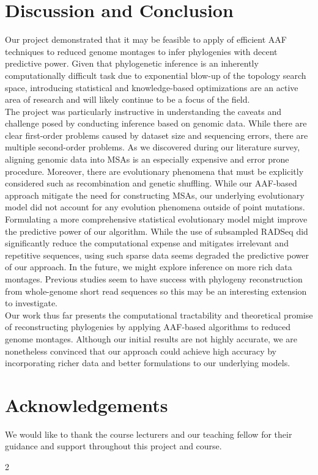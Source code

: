 \documentclass[a4paper]{article}
\begin{document}
\begin{multicols}{2}
\section{Discussion and Conclusion}
Our project demonstrated that it may be feasible to apply of efficient AAF techniques to reduced genome montages to infer phylogenies with decent predictive power. Given that phylogenetic inference is an inherently computationally difficult task due to exponential blow-up of the topology search space, introducing statistical and knowledge-based optimizations are an active area of research and will likely continue to be a focus of the field.\\

The project was particularly instructive in understanding the caveats and challenge posed by conducting inference based on genomic data. While there are clear first-order problems caused by dataset size and sequencing errors, there are multiple second-order problems. As we discovered during our literature survey, aligning genomic data into MSAs is an especially expensive and error prone procedure. Moreover, there are evolutionary phenomena that must be explicitly considered such as recombination and genetic shuffling. While our AAF-based approach mitigate the need for constructing MSAs, our underlying evolutionary model did not account for any evolution phenomena outside of point mutations. Formulating a more comprehensive statistical evolutionary model might improve the predictive power of our algorithm. While the use of subsampled RADSeq did significantly reduce the computational expense and mitigates irrelevant and repetitive sequences, using such sparse data seems degraded the predictive power of our approach. In the future, we might explore inference on more rich data montages. Previous studies seem to have success with phylogeny reconstruction from whole-genome short read sequences so this may be an interesting extension to investigate.\\

Our work thus far presents the computational tractability and theoretical promise of reconstructing phylogenies by applying AAF-based algorithms to reduced genome montages. Although our initial results are not highly accurate, we are nonetheless convinced that our approach could achieve high accuracy by incorporating richer data and better formulations to our underlying models.

\section{Acknowledgements}
We would like to thank the course lecturers and our teaching fellow for their guidance and support throughout this project and course.
\end{multicols}{2}
\end{document}
